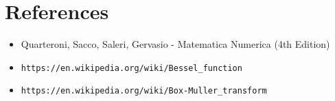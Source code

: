 \documentclass[a4paper, 11pt, oneside]{scrartcl}
\begin{document}
\section{References}
\begin{itemize}
\item[1] Quarteroni, Sacco, Saleri, Gervasio - Matematica Numerica (4th Edition) 
\item[2] \texttt{https://en.wikipedia.org/wiki/Bessel\_function}
\item[3] \texttt{https://en.wikipedia.org/wiki/Box-Muller\_transform}
\end{itemize}
\end{document}

